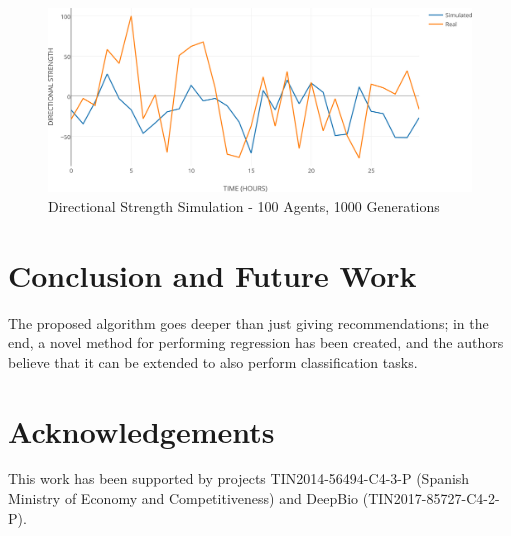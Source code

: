 \documentclass[a4paper,twoside]{article}
\begin{document}
\begin{figure}[h!]
\begin{center}
\includegraphics[width=1.00\columnwidth]{figures/ds-sim-100agents-1000gen/ds-sim-100agents-1000gen}
\caption{{\label{ds-prediction-1000}Directional Strength Simulation - 100 Agents, 1000 Generations%
}}
\end{center}
\end{figure}

\section{Conclusion and Future Work}
\label{conclusions}



The proposed 
algorithm goes deeper than just giving recommendations; in the end, a
novel method for performing regression has been created, and the authors
believe that it can be extended to also perform classification tasks.


\section{Acknowledgements}

This work has been supported by
projects TIN2014-56494-C4-3-P (Spanish Ministry of Economy and
Competitiveness) and DeepBio (TIN2017-85727-C4-2-P).



\end{document}
